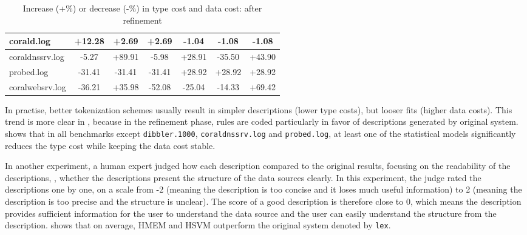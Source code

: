 {\begin{table}[th]
\begin{center}
\begin{tabular}{|l||c|c|c||c|c|c|}
corald.log 		& +12.28 & +2.69 & +2.69 & -1.04 & -1.08 & -1.08   \\ \hline 
coraldnssrv.log  	& -5.27 & +89.91 & -5.98 & +28.91 & -35.50 & +43.90 \\ \hline
probed.log 		& -31.41 & -31.41 & -31.41 & +28.92 & +28.92 & +28.92 \\ \hline
coralwebsrv.log 	& -36.21 & +35.98 & -52.08 & -25.04 & -14.33 & +69.42 \\ \hline
\end{tabular}
\caption{Increase (+\%) or decrease (-\%) in type cost and data
cost: after refinement} \label{tab:complexity2}
\end{center}
\end{table}

In practise, better tokenization schemes usually result in simpler
descriptions (lower type costs), but looser fits (higher data
costs). This trend is more clear in , because
in the refinement phase, rules are coded particularly in favor of
descriptions generated by original \learnpads{} system.  shows that in all benchmarks except
{\tt dibbler.1000}, {\tt coraldnssrv.log} and {\tt probed.log}, at
least one of the statistical models significantly reduces the type
cost while keeping the data cost stable.
}%

In another experiment, a human expert judged how each
description compared to the original \learnpads{} results,
focusing on the readability of the descriptions, \ie{},
whether the descriptions present the structure of the data
sources clearly. In this experiment, the judge rated the
descriptions one by one, on a scale from -2 (meaning the description is
too concise and it loses much useful information) to 2 (meaning the
description is too precise and the structure is unclear). The
score of a good description is therefore close to 0, which means the
description provides sufficient information for the user to
understand the data source and the user can easily understand
the structure from the description.  shows that
on average, HMEM and HSVM outperform the original system
denoted by {\tt lex}.


